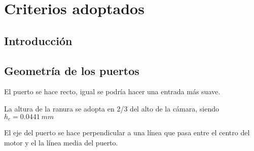 
\chapter{Criterios adoptados}
\label{capitulo5}
\section{Introducción}
\section{Geometría de los puertos}

El puerto se hace recto, igual se podría hacer una entrada más suave.

La altura de la ranura se adopta en 2/3 del alto de la cámara, siendo $h_c=0.0441\ mm$

El eje del puerto se hace perpendicular a una línea que pasa entre el centro
del motor y el la línea media del puerto.


